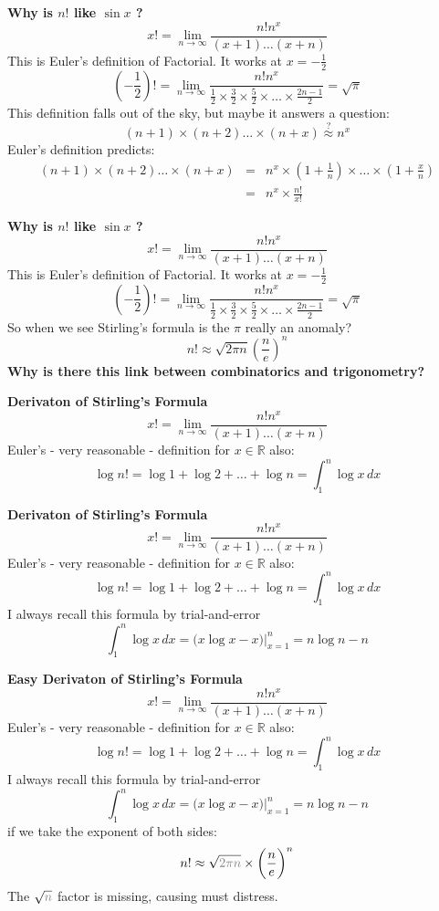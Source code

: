 \documentclass[12pt]{article}
\begin{document}
\newpage

\noindent \textbf{Why is $n!$ like $\sin x$ ?  }
$$ x! = \lim_{n \to \infty} \frac{n! n^x}{(x+1)\dots(x+n)} $$
This is Euler's definition of Factorial.  It works at $x = - \frac{1}{2}$
$$ (-\frac{1}{2})! = \lim_{n \to \infty} \frac{n! n^x}{ \frac{1}{2} \times \frac{3}{2} \times \frac{5}{2}\times \dots \times \frac{2n-1}{2}} = \sqrt{\pi} $$
This definition falls out of the sky, but maybe it answers a question:
$$ (n+1)\times (n+2) \dots \times (n+x)
\stackrel{?}{\approx} n^x $$
Euler's definition predicts:
\begin{eqnarray*} (n+1)\times (n+2) \dots \times (n+x)
&=& n^x \times (1 + \frac{1}{n}) \times \dots \times (1 + \frac{x}{n}) \\ 
&=& n^x \times \frac{n!}{x!}\end{eqnarray*}

\newpage

\noindent \textbf{Why is $n!$ like $\sin x$ ?  }
$$ x! = \lim_{n \to \infty} \frac{n! n^x}{(x+1)\dots(x+n)} $$
This is Euler's definition of Factorial.  It works at $x = - \frac{1}{2}$
$$ (-\frac{1}{2})! = \lim_{n \to \infty} \frac{n! n^x}{ \frac{1}{2} \times \frac{3}{2} \times \frac{5}{2}\times \dots \times \frac{2n-1}{2}} = \sqrt{\pi} $$
So when we see Stirling's formula is the $\pi$ really an anomaly?
$$ n! \approx \sqrt{2\pi n } \left(\frac{n}{e}\right)^n $$
\textbf{Why is there this link between combinatorics and trigonometry?}

\newpage

\noindent \textbf{Derivaton of Stirling's Formula}
$$ x! = \lim_{n \to \infty} \frac{n! n^x}{(x+1)\dots(x+n)} $$
Euler's - very reasonable - definition for $x \in \mathbb{R}$ also:
$$ \log n! = \log 1 + \log 2 + \dots + \log n = \int_1^n \log x \, dx$$


\newpage

\noindent \textbf{Derivaton of Stirling's Formula}
$$ x! = \lim_{n \to \infty} \frac{n! n^x}{(x+1)\dots(x+n)} $$
Euler's - very reasonable - definition for $x \in \mathbb{R}$ also:
$$ \log n! = \log 1 + \log 2 + \dots + \log n = \int_1^n \log x \, dx$$
I always recall this formula by trial-and-error
$$ 
\int_1^n \log x \, dx
= \big( x \log x - x \big) \bigg|_{x=1}^n
= n \log n - n
$$

\newpage

\noindent \textbf{Easy Derivaton of Stirling's Formula}
$$ x! = \lim_{n \to \infty} \frac{n! n^x}{(x+1)\dots(x+n)} $$
Euler's - very reasonable - definition for $x \in \mathbb{R}$ also:
$$ \log n! = \log 1 + \log 2 + \dots + \log n = \int_1^n \log x \, dx$$
I always recall this formula by trial-and-error
$$ 
\int_1^n \log x \, dx
= \big( x \log x - x \big) \bigg|_{x=1}^n
= n \log n - n
$$
if we take the exponent of both sides:
$$ n! \approx \sqrt{\color{gray}{2\pi n}} \times \bigg(\frac{n}{e}\bigg)^n $$
The $\sqrt{\color{gray}{n}}$ factor is missing, causing must distress.  
\end{document}
